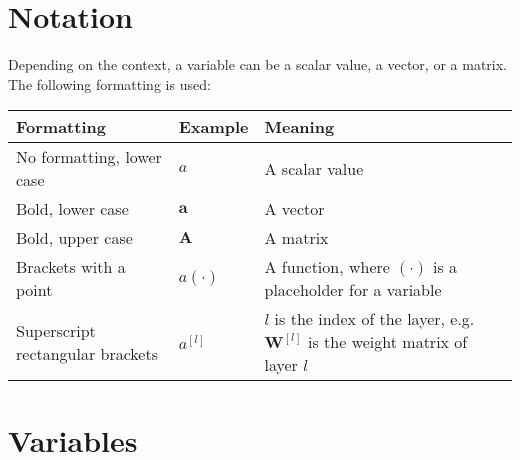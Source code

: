 

\section{Notation}

Depending on the context, a variable can be a scalar value, a vector, or a matrix. The following formatting is used:

\begin{tabular}{ p{4cm} p{3cm} p{7cm} }
	\textbf{Formatting} & \textbf{Example} & \textbf{Meaning}\\
	\hline
  	No formatting, lower case & $a$ & A scalar value\\
  	Bold, lower case & $\boldsymbol{a}$ & A vector\\
  	Bold, upper case & $\boldsymbol{A}$ & A matrix\\
  	Brackets with a point & $a(\cdot)$ & A function, where $(\cdot)$ is a placeholder for a variable\\
  	Superscript rectangular brackets & $a^{[l]}$ & $l$ is the index of the layer, e.g. $\boldsymbol{W}^{[l]}$ is the weight matrix of layer $l$\\
\end{tabular}


\section{Variables}

